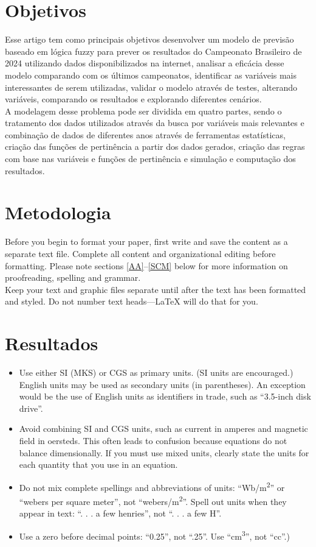 \documentclass[conference]{IEEEtran}
\begin{document}
\section{Objetivos}
\indent Esse artigo tem como principais objetivos desenvolver um modelo de 
previsão baseado em lógica fuzzy para prever os resultados do Campeonato 
Brasileiro de 2024 utilizando dados disponibilizados na internet, analisar a 
eficácia desse modelo comparando com os últimos campeonatos, identificar as 
variáveis mais interessantes de serem utilizadas, validar o modelo através de 
testes, alterando variáveis, comparando os resultados e explorando diferentes 
cenários.\\
\indent A modelagem desse problema pode ser dividida em quatro partes, sendo o 
tratamento dos dados utilizados através da busca por variáveis mais 
relevantes e combinação de dados de diferentes anos através de ferramentas 
estatísticas, criação das funções de pertinência a partir dos dados gerados, 
criação das regras com base nas variáveis e funções de pertinência e simulação 
e computação dos resultados.

\section{Metodologia}
\indent Before you begin to format your paper, first write and save the content as a 
separate text file. Complete all content and organizational editing before 
formatting. Please note sections \ref{AA}--\ref{SCM} below for more information on 
proofreading, spelling and grammar.\\
\indent Keep your text and graphic files separate until after the text has been 
formatted and styled. Do not number text heads---{\LaTeX} will do that 
for you.

\section{Resultados}
\begin{itemize}
\item Use either SI (MKS) or CGS as primary units. (SI units are encouraged.) English units may be used as secondary units (in parentheses). An exception would be the use of English units as identifiers in trade, such as ``3.5-inch disk drive''.
\item Avoid combining SI and CGS units, such as current in amperes and magnetic field in oersteds. This often leads to confusion because equations do not balance dimensionally. If you must use mixed units, clearly state the units for each quantity that you use in an equation.
\item Do not mix complete spellings and abbreviations of units: ``Wb/m\textsuperscript{2}'' or ``webers per square meter'', not ``webers/m\textsuperscript{2}''. Spell out units when they appear in text: ``. . . a few henries'', not ``. . . a few H''.
\item Use a zero before decimal points: ``0.25'', not ``.25''. Use ``cm\textsuperscript{3}'', not ``cc''.)
\end{itemize}
\end{document}
